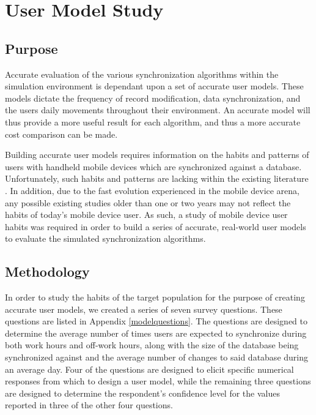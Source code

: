 \chapter{User Model Study} \label{proposed_study}

\section{Purpose}

Accurate evaluation of the various synchronization algorithms within the simulation environment is dependant upon a set of accurate user models.  These models dictate the frequency of record modification, data synchronization, and the users daily movements throughout their environment.  An accurate model will thus provide a more useful result for each algorithm, and thus a more accurate cost comparison can be made.

Building accurate user models requires information on the habits and patterns of users with handheld mobile devices which are synchronized against a database.  Unfortunately, such habits and patterns are lacking within the existing literature \cite{optSyncTimes}.  In addition, due to the fast evolution experienced in the mobile device arena, any possible existing studies older than one or two years may not reflect the habits of today's mobile device user.  As such, a study of mobile device user habits was required in order to build a series of accurate, real-world user models to evaluate the simulated synchronization algorithms.

\section{Methodology}

In order to study the habits of the target population for the purpose of creating accurate user models, we created a series of seven survey questions.  These questions are listed in Appendix \ref{modelquestions}.  The questions are designed to determine the average number of times users are expected to synchronize during both work hours and off-work hours, along with the size of the database being synchronized against and the average number of changes to said database during an average day.  Four of the questions are designed to elicit specific numerical responses from which to design a user model, while the remaining three questions are designed to determine the respondent's confidence level for the values reported in three of the other four questions.

